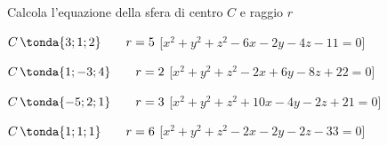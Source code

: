 \begin{esercizio}
Calcola l'equazione della sfera di centro $C$ e raggio $r$
 \begin{enumeratea}
  \item  \(C\,\tonda{3;1;2} \qquad r = 5\)    \hfill [\(x^2+y^2+z^2-6x-2y-4z-11=0\)]
  \item  \(C\,\tonda{1;-3;4} \qquad r = 2\)    \hfill [\(x^2+y^2+z^2-2x+6y-8z+22=0\)]
  \item  \(C\,\tonda{-5;2;1} \qquad r = 3\)    \hfill [\(x^2+y^2+z^2+10x-4y-2z+21=0\)]
  \item  \(C\,\tonda{1;1;1} \qquad r = 6\)    \hfill [\(x^2+y^2+z^2-2x-2y-2z-33=0\)]
 \end{enumeratea}
\end{esercizio}

% 
% 
